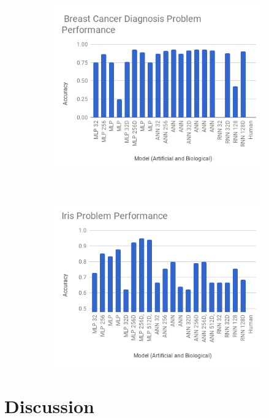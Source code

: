 \documentclass[]{report}
\begin{document}
\begin{figure}[H]
\begin{subfigure}[b]{0.45\textwidth}
		\includegraphics[width=\textwidth]{chart4.png}
	\end{subfigure}
	~
	\begin{subfigure}[b]{0.45\textwidth}
		\includegraphics[width=\textwidth]{chart5.png}
	\end{subfigure}
\end{figure}


\section{Discussion}
\end{document}
